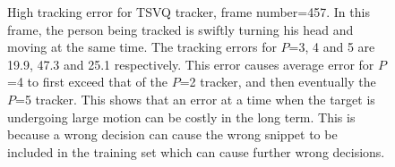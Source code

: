 \begin{figure}[h!]
\centering
{}
\caption{High tracking error for TSVQ tracker, frame number=457.  In this frame, the person being tracked is swiftly turning his head and moving at the same time.  The tracking errors for $P$=3, 4 and 5 are 19.9, 47.3 and 25.1 respectively.  This error causes average error for $P$=4 to first exceed that of the $P$=2 tracker, and then eventually the $P$=5 tracker.  This shows that an error at a time when the target is undergoing large motion can be costly in the long term.  This is because a wrong decision can cause the wrong snippet to be included in the training set which can cause further wrong decisions.}
\label{fig:results_TSVQ_Dudek_FN457}
\end{figure}
